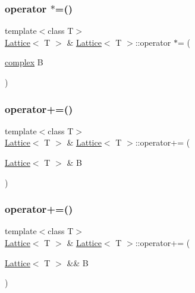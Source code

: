 \mbox{\label{class_lattice_ae4405517258f14d94479ad6f2c2f4343}} 
\subsubsection{\texorpdfstring{operator $\ast$=()}{operator *=()}\hspace{0.1cm}{\footnotesize\ttfamily [4/4]}}
{\footnotesize\ttfamily template$<$class T$>$ \\
\mbox{\hyperlink{class_lattice}{Lattice}}$<$ T $>$ \& \mbox{\hyperlink{class_lattice}{Lattice}}$<$ T $>$\+::operator $\ast$= (\begin{DoxyParamCaption}\item[{\mbox{\hyperlink{classcomplex}{complex}}}]{B }\end{DoxyParamCaption})\hspace{0.3cm}{\ttfamily [inline]}}

\mbox{\label{class_lattice_aa5eb9113987a4a411cd57245d591a458}} 
\subsubsection{\texorpdfstring{operator+=()}{operator+=()}\hspace{0.1cm}{\footnotesize\ttfamily [1/3]}}
{\footnotesize\ttfamily template$<$class T$>$ \\
\mbox{\hyperlink{class_lattice}{Lattice}}$<$ T $>$ \& \mbox{\hyperlink{class_lattice}{Lattice}}$<$ T $>$\+::operator+= (\begin{DoxyParamCaption}\item[{\mbox{\hyperlink{class_lattice}{Lattice}}$<$ T $>$ \&}]{B }\end{DoxyParamCaption})\hspace{0.3cm}{\ttfamily [inline]}}

\mbox{\label{class_lattice_a83e9265a5da00384a19dc47eff5f9e00}} 
\subsubsection{\texorpdfstring{operator+=()}{operator+=()}\hspace{0.1cm}{\footnotesize\ttfamily [2/3]}}
{\footnotesize\ttfamily template$<$class T$>$ \\
\mbox{\hyperlink{class_lattice}{Lattice}}$<$ T $>$ \& \mbox{\hyperlink{class_lattice}{Lattice}}$<$ T $>$\+::operator+= (\begin{DoxyParamCaption}\item[{\mbox{\hyperlink{class_lattice}{Lattice}}$<$ T $>$ \&\&}]{B }\end{DoxyParamCaption})\hspace{0.3cm}{\ttfamily [inline]}}

